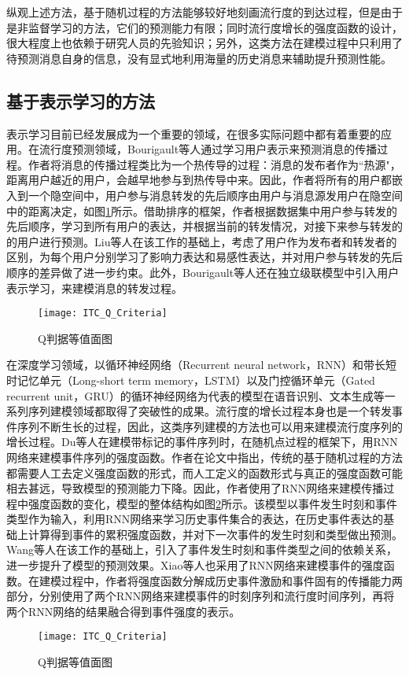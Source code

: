 纵观上述方法，基于随机过程的方法能够较好地刻画流行度的到达过程，但是由于是非监督学习的方法，它们的预测能力有限；同时流行度增长的强度函数的设计，很大程度上也依赖于研究人员的先验知识；另外，这类方法在建模过程中只利用了待预测消息自身的信息，没有显式地利用海量的历史消息来辅助提升预测性能。

\subsection{基于表示学习的方法}
表示学习目前已经发展成为一个重要的领域，在很多实际问题中都有着重要的应用。在流行度预测领域，Bourigault等人\citep{bourigault2014learning}通过学习用户表示来预测消息的传播过程。作者将消息的传播过程类比为一个热传导的过程：消息的发布者作为``热源"，距离用户越近的用户，会越早地参与到热传导中来。因此，作者将所有的用户都嵌入到一个隐空间中，用户参与消息转发的先后顺序由用户与消息源发用户在隐空间中的距离决定，如图\ref{fig:heat}所示。借助排序的框架，作者根据数据集中用户参与转发的先后顺序，学习到所有用户的表达，并根据当前的转发情况，对接下来参与转发的的用户进行预测。Liu等人\citep{liu2016learning}在该工作的基础上，考虑了用户作为发布者和转发者的区别，为每个用户分别学习了影响力表达和易感性表达，并对用户参与转发的先后顺序的差异做了进一步约束。此外，Bourigault等人\citep{bourigault2016representation}还在独立级联模型\citep{goldenberg2001talk}中引入用户表示学习，来建模消息的转发过程。
\begin{figure}[!htbp]
  \centering
  \texttt{[image: ITC\_Q\_Criteria]}
  \caption{Q判据等值面图}
  \label{fig:heat}
\end{figure}

在深度学习领域，以循环神经网络（Recurrent neural network，RNN）\citep{mikolov2010recurrent}和带长短时记忆单元（Long-short term memory，LSTM）\citep{hochreiter1997long}以及门控循环单元（Gated recurrent unit，GRU）\citep{cho2014learning}的循环神经网络为代表的模型在语音识别、文本生成等一系列序列建模领域都取得了突破性的成果。流行度的增长过程本身也是一个转发事件序列不断生长的过程，因此，这类序列建模的方法也可以用来建模流行度序列的增长过程。Du等人\citep{du2016recurrent}在建模带标记的事件序列时，在随机点过程的框架下，用RNN网络来建模事件序列的强度函数。作者在论文中指出，传统的基于随机过程的方法都需要人工去定义强度函数的形式，而人工定义的函数形式与真正的强度函数可能相去甚远，导致模型的预测能力下降。因此，作者使用了RNN网络来建模传播过程中强度函数的变化，模型的整体结构如图\ref{fig:rmtpp}所示。该模型以事件发生时刻和事件类型作为输入，利用RNN网络来学习历史事件集合的表达，在历史事件表达的基础上计算得到事件的累积强度函数，并对下一次事件的发生时刻和类型做出预测。Wang等人\citep{wang2017marked}在该工作的基础上，引入了事件发生时刻和事件类型之间的依赖关系，进一步提升了模型的预测效果。Xiao等人\citep{xiao2017modeling}也采用了RNN网络来建模事件的强度函数。在建模过程中，作者将强度函数分解成历史事件激励和事件固有的传播能力两部分，分别使用了两个RNN网络来建模事件的时刻序列和流行度时间序列，再将两个RNN网络的结果融合得到事件强度的表示。
\begin{figure}[!htbp]
  \centering
  \texttt{[image: ITC\_Q\_Criteria]}
  \caption{Q判据等值面图}
  \label{fig:rmtpp}
\end{figure}

